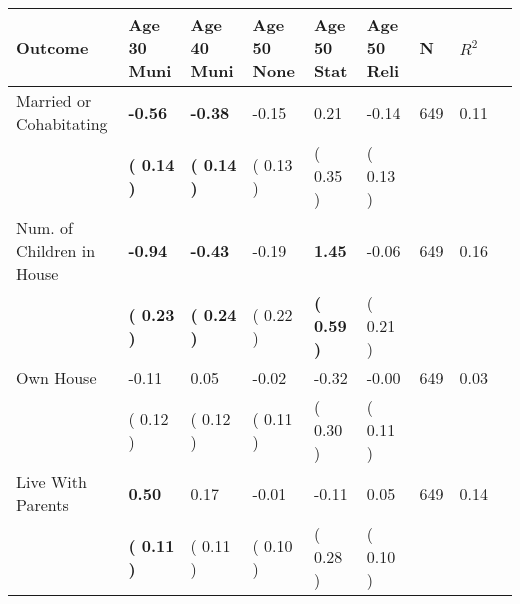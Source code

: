 \begin{tabular}{L{6.2cm} C{1.8cm} C{1.8cm} C{1.8cm} C{1.8cm} C{1.8cm} C{1.8cm} C{0.3cm} C{0.3cm}}
\toprule
 \textbf{Outcome} & \textbf{Age 30 Muni} & \textbf{Age 40 Muni} & \textbf{Age 50 None} & \textbf{Age 50 Stat} & \textbf{Age 50 Reli} & \textbf{N} & \textbf{$ R^2$} \\
\midrule
Married or Cohabitating & \textbf{    -0.56} & \textbf{    -0.38} &     -0.15 &      0.21 &     -0.14  & 649 &       0.11 \\ 
 & \textbf{(     0.14 )} & \textbf{(     0.14 )} & (     0.13 ) & (     0.35 ) & (     0.13 )  & \\
Num. of Children in House & \textbf{    -0.94} & \textbf{    -0.43} &     -0.19 & \textbf{     1.45} &     -0.06  & 649 &       0.16 \\ 
 & \textbf{(     0.23 )} & \textbf{(     0.24 )} & (     0.22 ) & \textbf{(     0.59 )} & (     0.21 )  & \\
Own House &     -0.11 &      0.05 &     -0.02 &     -0.32 &     -0.00  & 649 &       0.03 \\ 
 & (     0.12 ) & (     0.12 ) & (     0.11 ) & (     0.30 ) & (     0.11 )  & \\
Live With Parents & \textbf{     0.50} &      0.17 &     -0.01 &     -0.11 &      0.05  & 649 &       0.14 \\ 
 & \textbf{(     0.11 )} & (     0.11 ) & (     0.10 ) & (     0.28 ) & (     0.10 )  & \\
\bottomrule
\end{tabular}
